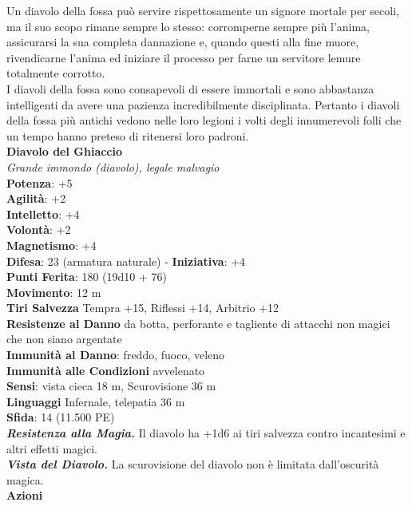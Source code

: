 \begin{multicols}{2}
Un diavolo della fossa può servire rispettosamente un signore mortale per secoli, ma il suo scopo rimane sempre lo stesso: corromperne sempre più l’anima, assicurarsi la sua completa dannazione e, quando questi alla fine muore, rivendicarne l’anima ed iniziare il processo per farne un servitore lemure totalmente corrotto.\\

I diavoli della fossa sono consapevoli di essere immortali e sono abbastanza intelligenti da avere una pazienza incredibilmente disciplinata. Pertanto i diavoli della fossa più antichi vedono nelle loro legioni i volti degli innumerevoli folli che un tempo hanno preteso di ritenersi loro padroni.\\

\medskip\textbf{Diavolo del Ghiaccio}\\
\emph{Grande immondo (diavolo), legale malvagio}\\
\textbf{Potenza}: +5\\
\textbf{Agilità}: +2\\
\textbf{Intelletto}: +4\\
\textbf{Volontà}: +2\\
\textbf{Magnetismo}: +4\\
\textbf{Difesa}: 23 (armatura naturale) - \textbf{Iniziativa}: +4\\
\textbf{Punti Ferita}: 180 (19d10 + 76)\\
\textbf{Movimento}: 12 m\\
\textbf{Tiri Salvezza} Tempra +15, Riflessi +14, Arbitrio +12\\
\textbf{Resistenze al Danno} da botta, perforante e tagliente di attacchi non magici che non siano argentate\\
\textbf{Immunità al Danno}: freddo, fuoco, veleno\\
\textbf{Immunità alle Condizioni} avvelenato\\
\textbf{Sensi}: vista cieca 18 m, Scurovisione 36 m\\
\textbf{Linguaggi} Infernale, telepatia 36 m \\
\textbf{Sfida}: 14 (11.500 PE)\smallskip\\
\emph{\textbf{Resistenza alla Magia.}} Il diavolo ha +1d6 ai tiri salvezza contro incantesimi e altri effetti magici.\\
\emph{\textbf{Vista del Diavolo.}} La scurovisione del diavolo non è limitata dall'oscurità magica.\\
\smallskip\textbf{Azioni}\\

\end{multicols}
